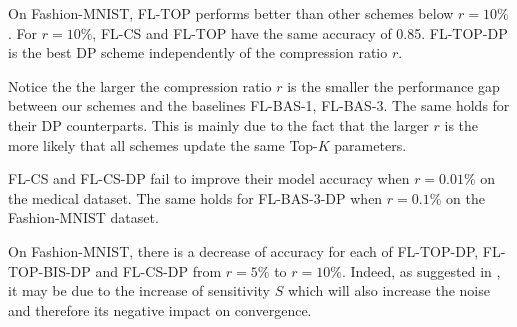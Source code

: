 \documentclass[accepted]{uai2021} %
\newcommand{\TOPK}{Top-$K$\xspace}
\begin{document}
On Fashion-MNIST, FL-TOP performs better than other schemes below $r=10\%$. For $r=10\%$,  FL-CS and FL-TOP have the same accuracy of 0.85. FL-TOP-DP is the best DP scheme independently of the compression ratio $r$. 

Notice the the larger the compression ratio $r$ is the smaller the performance gap between our schemes and the baselines FL-BAS-1, FL-BAS-3. The same holds for their DP counterparts. This is mainly due to the fact that the larger $r$ is the more likely that all schemes update the same \TOPK parameters. 

FL-CS and FL-CS-DP fail to improve their model accuracy when $r=0.01\%$ on the medical dataset. The same holds for FL-BAS-3-DP when $r=0.1\%$ on the Fashion-MNIST dataset.

On Fashion-MNIST, there is a decrease of accuracy for each of FL-TOP-DP, FL-TOP-BIS-DP and FL-CS-DP from $r=5\%$ to $r=10\%$. Indeed, as suggested in \cite{our_cs}, it may be due to the increase of sensitivity $S$ which will also increase the noise and therefore its negative impact on convergence.  

\begin{table*}[!h]
	\caption{Descriptions of features} 
	\label{tab:data_description}
\end{table*}
\end{document}
